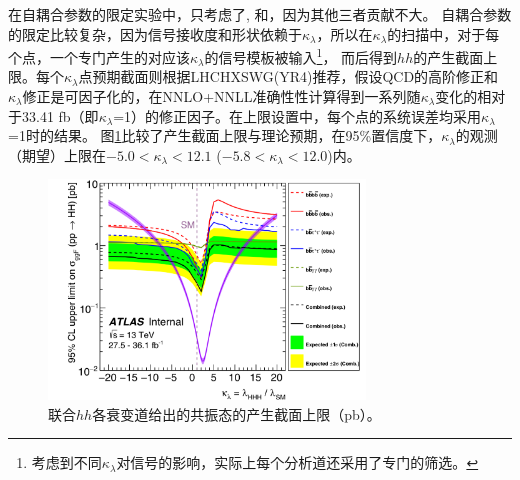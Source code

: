 在自耦合参数的限定实验中，只考虑了\bbbb , \bbtt 和\bbaa ，因为其他三者贡献不大。
自耦合参数的限定比较复杂，因为信号接收度和形状依赖于$\kappa_{\lambda}$，所以在$\kappa_{\lambda}$的扫描中，对于每个点，一个专门产生的对应该$\kappa_{\lambda}$的信号模板被输入\footnote{考虑到不同$\kappa_{\lambda}$对信号的影响，实际上每个分析道还采用了专门的筛选。}，
而后得到$hh$的产生截面上限。每个$\kappa_{\lambda}$点预期截面则根据LHCHXSWG(YR4)\cite{SM-HIGGS-BR}推荐，假设QCD的高阶修正和$\kappa_{\lambda}$修正是可因子化的，在NNLO+NNLL准确性性计算得到一系列随$\kappa_{\lambda}$变化的相对于33.41 fb（即$\kappa_{\lambda}$=1）的修正因子。在上限设置中，每个点的系统误差均采用$\kappa_{\lambda}$=1时的结果。
图\ref{fig:HH_selfcoupling}比较了产生截面上限与理论预期，在95\%置信度下，$\kappa_{\lambda}$的观测（期望）上限在$-5.0<\kappa_{\lambda}<12.1$ ($-5.8<\kappa_{\lambda}<12.0$)内。
\begin{figure}[h]
\centering
 \includegraphics[width=0.75\textwidth]{fig/HH_selfcoupling.png}
 \caption{联合$hh$各衰变道给出的共振态的产生截面上限（pb）。}
 \label{fig:HH_selfcoupling}
\end{figure}

